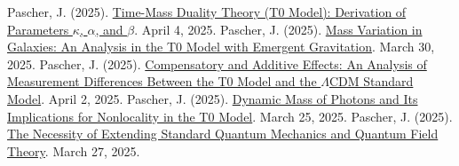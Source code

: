 \documentclass[a4paper,12pt]{article}
\begin{document}
	\begin{thebibliography}{99}
		 Pascher, J. (2025). \href{https://github.com/jpascher/T0-Time-Mass-Duality/tree/main/2/pdf/English/ZeitMasseT0ParamsEn.pdf}{Time-Mass Duality Theory (T0 Model): Derivation of Parameters \(\kappa\), \(\alpha\), and \(\beta\)}. April 4, 2025.
		 Pascher, J. (2025). \href{https://github.com/jpascher/T0-Time-Mass-Duality/tree/main/2/pdf/English/MassVarGalaxienEn.pdf}{Mass Variation in Galaxies: An Analysis in the T0 Model with Emergent Gravitation}. March 30, 2025.
		 Pascher, J. (2025). \href{https://github.com/jpascher/T0-Time-Mass-Duality/tree/main/2/pdf/English/MessdifferenzenT0StandardEn.pdf}{Compensatory and Additive Effects: An Analysis of Measurement Differences Between the T0 Model and the \(\Lambda\)CDM Standard Model}. April 2, 2025.
		 Pascher, J. (2025). \href{https://github.com/jpascher/T0-Time-Mass-Duality/tree/main/2/pdf/English/DynMassePhotonenNichtlokalEn.pdf}{Dynamic Mass of Photons and Its Implications for Nonlocality in the T0 Model}. March 25, 2025.
		 Pascher, J. (2025). \href{https://github.com/jpascher/T0-Time-Mass-Duality/tree/main/2/pdf/English/NotwendigkeitQMErweiterungEn.pdf}{The Necessity of Extending Standard Quantum Mechanics and Quantum Field Theory}. March 27, 2025.
	\end{thebibliography}
	
\end{document}

